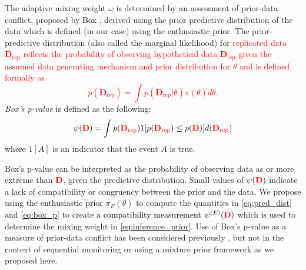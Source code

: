 \documentclass[12pt]{article}
\begin{document}
The adaptive mixing weight $\omega$ is determined by an assessment of prior-data conflict, proposed by \textcolor{black}{Box} \citep{Box1980}, derived using the prior predictive distribution of 
the data which is defined (in our case) using the \textcolor{black}{enthusiastic prior}.
The prior-predictive distribution (also called the marginal likelihood) for \textcolor{red}{replicated data $\mathbf{D}_{\text{rep}}$ reflects the probability of observing hypothetical data $\mathbf{D}_{\text{rep}}$ given 
the assumed data generating mechanism and prior distribution for $\theta$ and is defined formally as
\begin{equation}\label{eq:pred_dist}
p(\mathbf{D}_{\text{rep}}) =\int p(\mathbf{D}_{\text{rep}}|\theta)\pi(\theta)d\theta.
\end{equation}}
\textit{Box's p-value} is defined as the following:
\begin{equation}\label{eq:box_p}
\psi({\textcolor{red}{\mathbf{D}}})=\int {p(\textcolor{red}{\mathbf{D}_{\text{rep}}})}  1[p(\textcolor{red}{\mathbf{D}_{\text{rep}}})\leq p(\textcolor{red}{\mathbf{D}})] d(\textcolor{red}{\mathbf{D}_{\text{rep}}})
\end{equation}
%
where $1[A]$ is an indicator that the event $A$ is true.

Box's p-value can be interpreted as the probability of observing data as or more extreme than $\textcolor{red}{\mathbf{D}}$, given the predictive distribution. 
%
Small values of $\psi({\textcolor{red}{\mathbf{D}}})$ indicate a lack of compatibility or congruency between the prior and the data. 
%
We propose using the \textcolor{black}{enthusiastic prior} $\pi_E(\theta)$ to compute the quantities in \eqref{eq:pred_dist} and \eqref{eq:box_p} to create \textcolor{black}{a compatibility measurement} $\psi^{(E)}(\textcolor{red}{\mathbf{D}})$ which \textcolor{black}{is} used to determine the mixing weight in \eqref{eq:inference_prior}. Use of Box's p-value as a measure of prior-data conflict has been considered previously \citep{PsiodaXue2020}, but not in the context of sequential monitoring or using a mixture prior framework as we proposed here.
\end{document}
